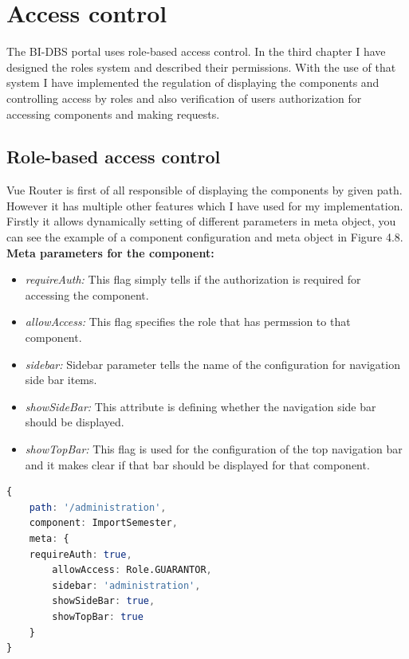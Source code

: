 \section{Access control} The BI-DBS portal uses role-based access control. In the third chapter I have designed the roles system and described their permissions. With the use of that system I have implemented the regulation of displaying the components and controlling access by roles and also verification of users authorization for accessing components and making requests.

\subsection{Role-based access control} Vue Router is first of all responsible of displaying the components by given path. However it has multiple other features which I have used for my implementation.\\
Firstly it allows dynamically setting of different parameters in meta object, you can see the example of a component configuration and meta object in Figure 4.8.\\

\noindent \textbf{Meta parameters for the component:}

\begin{itemize}
    \item \emph{requireAuth:} This flag simply tells if the authorization is required for accessing the component.
    \item \emph{allowAccess:} This flag specifies the role that has permssion to that component.
    \item \emph{sidebar:} Sidebar parameter tells the name of the configuration for navigation side bar items.
    \item \emph{showSideBar:} This attribute is defining whether the navigation side bar should be displayed.
    \item \emph{showTopBar:} This flag is used for the configuration of the top navigation bar and it makes clear if that bar should be displayed for that component.
\end{itemize}

\begin{lstlisting}[language=Octave, caption=The example of component configuration in Router]
{
    path: '/administration',
    component: ImportSemester,
    meta: {
    requireAuth: true,
        allowAccess: Role.GUARANTOR,
        sidebar: 'administration',
        showSideBar: true,
        showTopBar: true
    }
}
\end{lstlisting}

